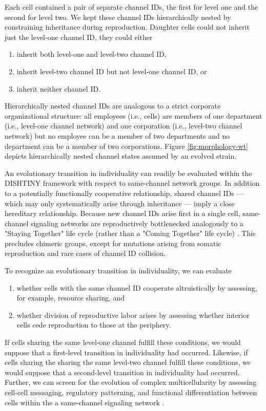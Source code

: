 Each cell contained a pair of separate channel IDs, the first for level one and the second for level two.
We kept these channel IDs hierarchically nested by constraining inheritance during reproduction.
Daughter cells could not inherit just the level-one channel ID, they could either
\begin{enumerate}
\item inherit both level-one and level-two channel ID,
\item inherit level-two channel ID but not level-one channel ID, or
\item inherit neither channel ID.
\end{enumerate}
Hierarchically nested channel IDs are analogous to a strict corporate organizational structure: all employees (i.e., cells) are members of one department (i.e., level-one channel network) and one corporation (i.e., level-two channel network) but no employee can be a member of two departments and no department can be a member of two corporations.
Figure \ref{fig:morphology-wt} depicts hierarchically nested channel states assumed by an evolved strain.

An evolutionary transition in individuality can readily be evaluated within the DISHTINY framework with respect to same-channel network groups.
In addition to a potentially functionally cooperative relationship, shared channel IDs --- which may only systematically arise through inheritance --- imply a close hereditary relationship.
Because new channel IDs arise first in a single cell, same-channel signaling networks are reproductively bottlenecked analogously to a "Staying Together" life cycle (rather than a "Coming Together" life cycle) \cite{staps2019emergence}.
This precludes chimeric groups, except for mutations arising from somatic reproduction and rare cases of channel ID collision.

To recognize an evolutionary transition in individuality, we can evaluate
\begin{enumerate}
\item whether cells with the same channel ID cooperate altruistically by assessing, for example, resource sharing, and
\item whether division of reproductive labor arises by assessing whether interior cells cede reproduction to those at the periphery.
\end{enumerate}
If cells sharing the same level-one channel fulfill these conditions, we would suppose that a first-level transition in individuality had occurred.
Likewise, if cells sharing the sharing the same level-two channel fulfill these conditions, we would suppose that a second-level transition in individuality had occurred.
Further, we can screen for the evolution of complex multicellularity by assessing cell-cell messaging, regulatory patterning, and functional differentiation between cells within the a same-channel signaling network \cite{knoll2011multiple}.


